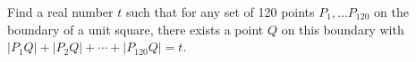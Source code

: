 Find a real number $t$ such that for any set of 120 points $P_1, \ldots P_{120}$ on the boundary of a unit square, there exists a point $Q$ on this boundary with $|P_1Q| + |P_2Q| + \cdots + |P_{120}Q| = t$.